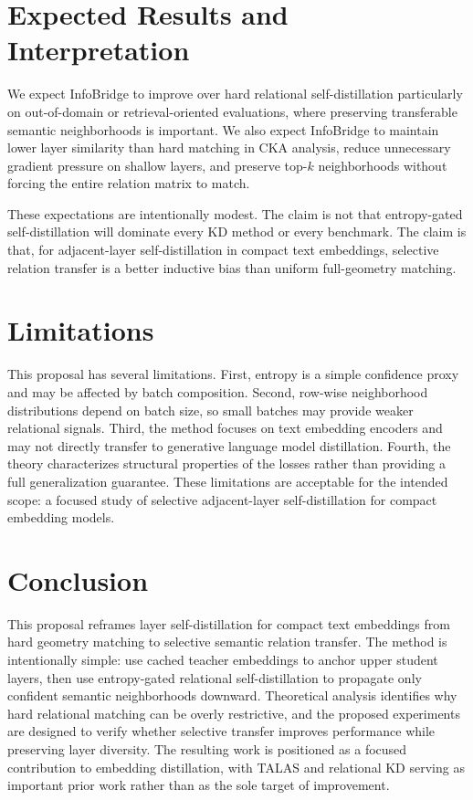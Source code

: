 \documentclass[letterpaper]{article}
\begin{document}
\section{Expected Results and Interpretation}

We expect InfoBridge to improve over hard relational self-distillation particularly on out-of-domain or retrieval-oriented evaluations, where preserving transferable semantic neighborhoods is important. We also expect InfoBridge to maintain lower layer similarity than hard matching in CKA analysis, reduce unnecessary gradient pressure on shallow layers, and preserve top-$k$ neighborhoods without forcing the entire relation matrix to match.

These expectations are intentionally modest. The claim is not that entropy-gated self-distillation will dominate every KD method or every benchmark. The claim is that, for adjacent-layer self-distillation in compact text embeddings, selective relation transfer is a better inductive bias than uniform full-geometry matching.

\section{Limitations}

This proposal has several limitations. First, entropy is a simple confidence proxy and may be affected by batch composition. Second, row-wise neighborhood distributions depend on batch size, so small batches may provide weaker relational signals. Third, the method focuses on text embedding encoders and may not directly transfer to generative language model distillation. Fourth, the theory characterizes structural properties of the losses rather than providing a full generalization guarantee. These limitations are acceptable for the intended scope: a focused study of selective adjacent-layer self-distillation for compact embedding models.

\section{Conclusion}

This proposal reframes layer self-distillation for compact text embeddings from hard geometry matching to selective semantic relation transfer. The method is intentionally simple: use cached teacher embeddings to anchor upper student layers, then use entropy-gated relational self-distillation to propagate only confident semantic neighborhoods downward. Theoretical analysis identifies why hard relational matching can be overly restrictive, and the proposed experiments are designed to verify whether selective transfer improves performance while preserving layer diversity. The resulting work is positioned as a focused contribution to embedding distillation, with TALAS and relational KD serving as important prior work rather than as the sole target of improvement.
\end{document}
